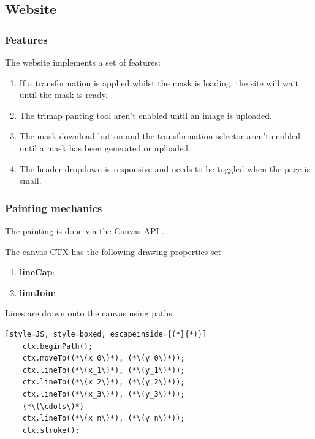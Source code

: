 \documentclass[a4paper]{article}
\begin{document}
\pagebreak

\subsection{Website}

\subsubsection{Features}

The website implements a set of features:
\begin{enumerate}
    \item If a transformation is applied whilst the mask is loading,
    the site will wait until the mask is ready.
    \item The \gls{trimap} panting tool aren't enabled until an image is uploaded.
    \item The mask download button and the transformation
    selector aren't enabled until a mask has been generated or uploaded.
    \item The header dropdown is responsive and needs to be toggled when the page
    is small.
\end{enumerate}


\pagebreak

\subsubsection{Painting mechanics}

The painting is done via the Canvas API \cite{canvasapi}.

The canvas CTX has the following drawing properties set
\begin{enumerate}
    \item \textbf{lineCap}: 
    \item \textbf{lineJoin}: 
\end{enumerate}

Lines are drawn onto the canvas using paths.
\begin{lstlisting}[style=JS, style=boxed, escapeinside={(*}{*)}]
    ctx.beginPath();
    ctx.moveTo((*\(x_0\)*), (*\(y_0\)*));
    ctx.lineTo((*\(x_1\)*), (*\(y_1\)*));
    ctx.lineTo((*\(x_2\)*), (*\(y_2\)*));
    ctx.lineTo((*\(x_3\)*), (*\(y_3\)*));
    (*\(\cdots\)*)
    ctx.lineTo((*\(x_n\)*), (*\(y_n\)*));
    ctx.stroke();
\end{lstlisting}
\end{document}
